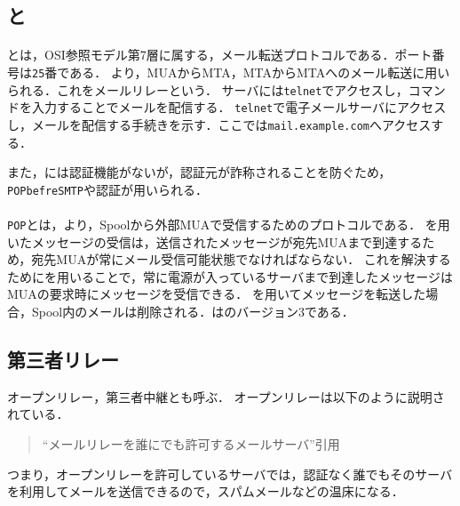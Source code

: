 \subsection{\bfseries\smtp と \popt}
\paragraph{\smtp}\smtp とは，OSI参照モデル第7層に属する，メール転送プロトコルである．ポート番号は\texttt{25}番である．
より，MUAからMTA，MTAからMTAへのメール転送に用いられる．これをメールリレーという．
\smtp サーバには\texttt{telnet}でアクセスし，コマンドを入力することでメールを配信する．
\texttt{telnet}で電子メールサーバにアクセスし，メールを配信する手続きを示す．ここでは\texttt{mail.example.com}へアクセスする．

また，\smtp には認証機能がないが，認証元が詐称されることを防ぐため，\texttt{POPbefreSMTP}や\smtp 認証が用いられる\cite[p.173]{インターネット工学}．
\paragraph{\popt}
\texttt{POP}とは，より，Spoolから外部MUAで受信するためのプロトコルである．
\smtp を用いたメッセージの受信は，送信されたメッセージが宛先MUAまで到達するため，宛先MUAが常にメール受信可能状態でなければならない．
これを解決するために\pop を用いることで，常に電源が入っている\pop サーバまで到達したメッセージはMUAの要求時にメッセージを受信できる．
\pop を用いてメッセージを転送した場合，Spool内のメールは削除される．\popt は\pop のバージョン3である．\hfill\cite[p.200, p.281]{マスタリングTCP/IP}
\subsection{第三者リレー}
オープンリレー，第三者中継とも呼ぶ．
オープンリレーは以下のように説明されている．
\begin{quote}
    ``メールリレーを誰にでも許可するメールサーバ''\hfill 引用\cite[p.53]{Postfix実用ガイド}
\end{quote}
つまり，オープンリレーを許可しているサーバでは，認証なく誰でもそのサーバを利用してメールを送信できるので，スパムメールなどの温床になる\cite[p.53]{Postfix実用ガイド}．